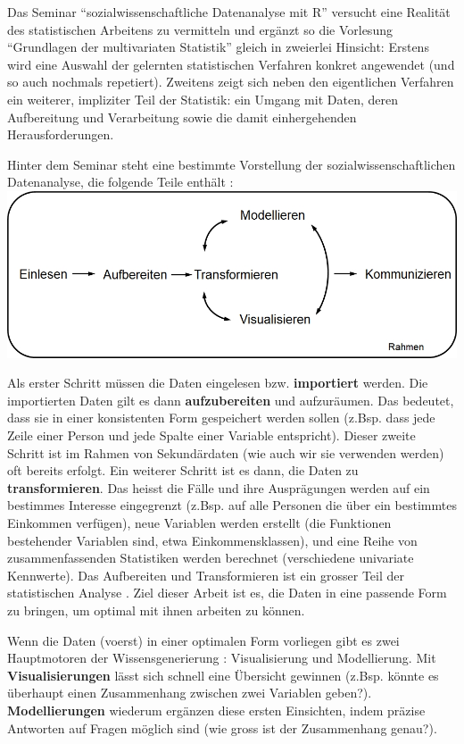 \documentclass[
]{book}
\begin{document}
Das Seminar ``sozialwissenschaftliche Datenanalyse mit R'' versucht eine Realität des statistischen Arbeitens zu vermitteln und ergänzt so die Vorlesung ``Grundlagen der multivariaten Statistik'' gleich in zweierlei Hinsicht: Erstens wird eine Auswahl der gelernten statistischen Verfahren konkret angewendet (und so auch nochmals repetiert). Zweitens zeigt sich neben den eigentlichen Verfahren ein weiterer, impliziter Teil der Statistik: ein Umgang mit Daten, deren Aufbereitung und Verarbeitung sowie die damit einhergehenden Herausforderungen.

Hinter dem Seminar steht eine bestimmte Vorstellung der sozialwissenschaftlichen Datenanalyse, die folgende Teile enthält \citep{WickhamGrolemund2016}:
\includegraphics{Bilder/Modell.jpg}

Als erster Schritt müssen die Daten eingelesen bzw. \textbf{importiert} werden. Die importierten Daten gilt es dann \textbf{aufzubereiten} und aufzuräumen. Das bedeutet, dass sie in einer konsistenten Form gespeichert werden sollen (z.Bsp. dass jede Zeile einer Person und jede Spalte einer Variable entspricht). Dieser zweite Schritt ist im Rahmen von Sekundärdaten (wie auch wir sie verwenden werden) oft bereits erfolgt. Ein weiterer Schritt ist es dann, die Daten zu \textbf{transformieren}. Das heisst die Fälle und ihre Ausprägungen werden auf ein bestimmes Interesse eingegrenzt (z.Bsp. auf alle Personen die über ein bestimmtes Einkommen verfügen), neue Variablen werden erstellt (die Funktionen bestehender Variablen sind, etwa Einkommensklassen), und eine Reihe von zusammenfassenden Statistiken werden berechnet (verschiedene univariate Kennwerte). Das Aufbereiten und Transformieren ist ein grosser Teil der statistischen Analyse \citep[es ist ein Kampf mit den Daten,][Kap.1.1]{WickhamGrolemund2016}. Ziel dieser Arbeit ist es, die Daten in eine passende Form zu bringen, um optimal mit ihnen arbeiten zu können.

Wenn die Daten (voerst) in einer optimalen Form vorliegen gibt es zwei Hauptmotoren der Wissensgenerierung \citep[Kap.1.1]{WickhamGrolemund2016}: Visualisierung und Modellierung. Mit \textbf{Visualisierungen} lässt sich schnell eine Übersicht gewinnen (z.Bsp. könnte es überhaupt einen Zusammenhang zwischen zwei Variablen geben?). \textbf{Modellierungen} wiederum ergänzen diese ersten Einsichten, indem präzise Antworten auf Fragen möglich sind (wie gross ist der Zusammenhang genau?).
\end{document}
